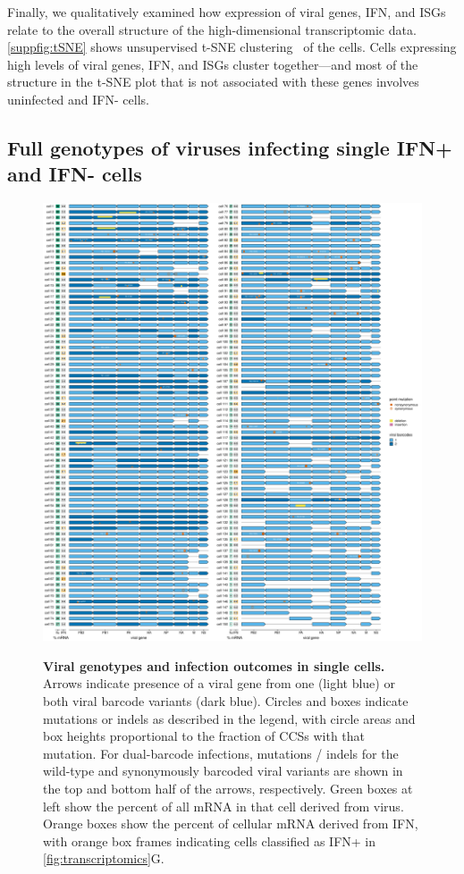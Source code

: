 \documentclass[10pt,letterpaper]{article}
\newenvironment{fullwidth}{%
  \begin{adjustwidth}{-2.3in}{}
}{\end{adjustwidth}}
\newcommand{\FIG}[1]{\autoref{fig:#1}}
\newcommand{\SUPPFIG}[1]{\autoref{suppfig:#1}}
\begin{document}
Finally, we qualitatively examined how expression of viral genes, IFN, and ISGs relate to the overall structure of the high-dimensional transcriptomic data.
\SUPPFIG{tSNE} shows unsupervised t-SNE clustering~\cite{maaten2008visualizing} of the cells.
Cells expressing high levels of viral genes, IFN, and ISGs cluster together---and most of the structure in the t-SNE plot that is not associated with these genes involves uninfected and IFN- cells.

\subsection*{Full genotypes of viruses infecting single IFN+ and IFN- cells}

\begin{figure}
\begin{fullwidth}
{\centering
\includegraphics[height=0.92\textheight]{figures/single_cell_figures/p_genotypes.pdf}
}
\caption{
{\bf Viral genotypes and infection outcomes in single cells.}
Arrows indicate presence of a viral gene from one (light blue) or both viral barcode variants (dark blue).
Circles and boxes indicate mutations or indels as described in the legend, with circle areas and box heights proportional to the fraction of CCSs with that mutation.
For dual-barcode infections, mutations / indels for the wild-type and synonymously barcoded viral variants are shown in the top and bottom half of the arrows, respectively. 
Green boxes at left show the percent of all mRNA in that cell derived from virus.
Orange boxes show the percent of cellular mRNA derived from IFN, with orange box frames indicating cells classified as IFN+ in \FIG{transcriptomics}G.
}
\label{fig:genotypes}

\end{fullwidth}
\end{figure}
\end{document}
